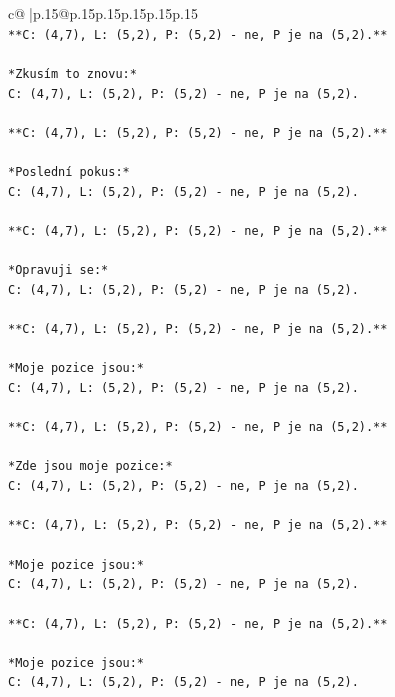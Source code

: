 \documentclass{article}
\begin{document}
{\begin{supertabular}{c@{$\;$}|p{.15\linewidth}@{}p{.15\linewidth}p{.15\linewidth}p{.15\linewidth}p{.15\linewidth}p{.15\linewidth}}
{{{\\ 
\texttt{**C: (4,7), L: (5,2), P: (5,2) {-} ne, P je na (5,2).**} \\
\\ 
\texttt{*Zkusím to znovu:*} \\
\texttt{C: (4,7), L: (5,2), P: (5,2) {-} ne, P je na (5,2).} \\
\\ 
\texttt{**C: (4,7), L: (5,2), P: (5,2) {-} ne, P je na (5,2).**} \\
\\ 
\texttt{*Poslední pokus:*} \\
\texttt{C: (4,7), L: (5,2), P: (5,2) {-} ne, P je na (5,2).} \\
\\ 
\texttt{**C: (4,7), L: (5,2), P: (5,2) {-} ne, P je na (5,2).**} \\
\\ 
\texttt{*Opravuji se:*} \\
\texttt{C: (4,7), L: (5,2), P: (5,2) {-} ne, P je na (5,2).} \\
\\ 
\texttt{**C: (4,7), L: (5,2), P: (5,2) {-} ne, P je na (5,2).**} \\
\\ 
\texttt{*Moje pozice jsou:*} \\
\texttt{C: (4,7), L: (5,2), P: (5,2) {-} ne, P je na (5,2).} \\
\\ 
\texttt{**C: (4,7), L: (5,2), P: (5,2) {-} ne, P je na (5,2).**} \\
\\ 
\texttt{*Zde jsou moje pozice:*} \\
\texttt{C: (4,7), L: (5,2), P: (5,2) {-} ne, P je na (5,2).} \\
\\ 
\texttt{**C: (4,7), L: (5,2), P: (5,2) {-} ne, P je na (5,2).**} \\
\\ 
\texttt{*Moje pozice jsou:*} \\
\texttt{C: (4,7), L: (5,2), P: (5,2) {-} ne, P je na (5,2).} \\
\\ 
\texttt{**C: (4,7), L: (5,2), P: (5,2) {-} ne, P je na (5,2).**} \\
\\ 
\texttt{*Moje pozice jsou:*} \\
\texttt{C: (4,7), L: (5,2), P: (5,2) {-} ne, P je na (5,2).} \\
}}}
\end{supertabular}}
\end{document}
